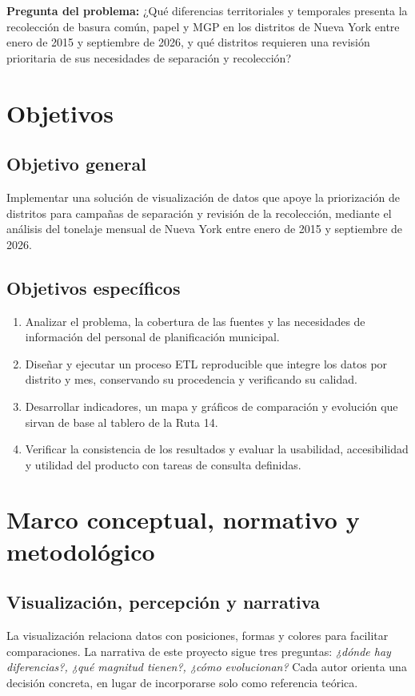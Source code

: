 \documentclass[10pt,a4paper]{article}
\begin{document}
\textbf{Pregunta del problema:} ¿Qué diferencias territoriales y temporales presenta la recolección de basura común, papel y MGP en los distritos de Nueva York entre enero de 2015 y septiembre de 2026, y qué distritos requieren una revisión prioritaria de sus necesidades de separación y recolección?

\newpage
\section{Objetivos}
\subsection{Objetivo general}
Implementar una solución de visualización de datos que apoye la priorización de distritos para campañas de separación y revisión de la recolección, mediante el análisis del tonelaje mensual de Nueva York entre enero de 2015 y septiembre de 2026.

\subsection{Objetivos específicos}
\begin{enumerate}
\item Analizar el problema, la cobertura de las fuentes y las necesidades de información del personal de planificación municipal.
\item Diseñar y ejecutar un proceso ETL reproducible que integre los datos por distrito y mes, conservando su procedencia y verificando su calidad.
\item Desarrollar indicadores, un mapa y gráficos de comparación y evolución que sirvan de base al tablero de la Ruta 14.
\item Verificar la consistencia de los resultados y evaluar la usabilidad, accesibilidad y utilidad del producto con tareas de consulta definidas.
\end{enumerate}

\section{Marco conceptual, normativo y metodológico}
\subsection{Visualización, percepción y narrativa}
La visualización relaciona datos con posiciones, formas y colores para facilitar comparaciones. La narrativa de este proyecto sigue tres preguntas: \textit{¿dónde hay diferencias?, ¿qué magnitud tienen?, ¿cómo evolucionan?} Cada autor orienta una decisión concreta, en lugar de incorporarse solo como referencia teórica.
\end{document}
